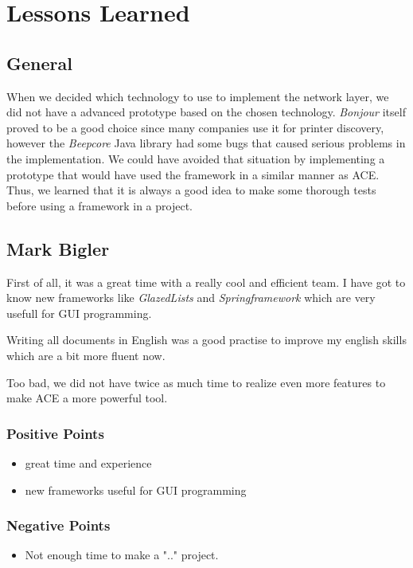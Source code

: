 \chapter{Lessons Learned}
\label{chapter:lessonslearned}



\section{General}
When we decided which technology to use to implement the network layer, we did
not have a advanced prototype based on the chosen technology. \emph{Bonjour}
itself proved to be a good choice since many companies use it for printer discovery, however the \emph{Beepcore} Java library had some bugs that caused serious problems in the implementation. We could have avoided that situation by implementing a prototype that would have used
the framework in a similar manner as ACE. Thus, we learned that it is always a good idea to make some thorough tests before using a framework in a project.



\section{Mark Bigler}
First of all, it was a great time with a really cool and efficient team. I have got to know new frameworks like \textit{GlazedLists} and \textit{Springframework} which are very usefull for GUI programming.

Writing all documents in English was a good practise to improve my english skills which are a bit more fluent now.

Too bad, we did not have twice as much time to realize even more features to make ACE a more powerful tool.
\subsection{Positive Points}
\begin{itemize}
\item great time and experience
\item new frameworks useful for GUI programming
\end{itemize}

\subsection{Negative Points}
\begin{itemize}
\item Not enough time to make a ".." project.
\end{itemize}



